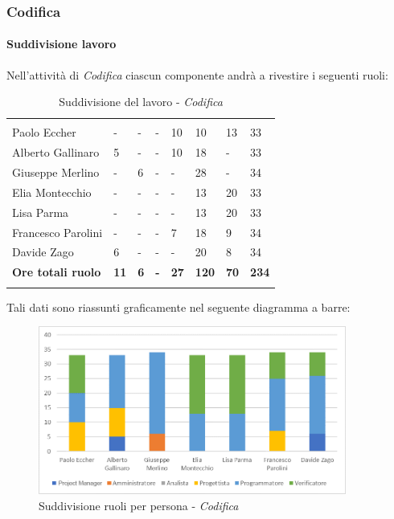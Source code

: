 		
		\subsubsection{Codifica}
			\paragraph{Suddivisione lavoro} \Spazio
			Nell'attività di \textit{Codifica} ciascun componente andrà a rivestire i seguenti ruoli:
			\begin{table}[H]
				\centering
				\begin{tabular}{|C{4cm}|C{0.8cm}|C{0.8cm}|C{0.8cm}|C{0.8cm}|C{0.8cm}|C{0.8cm}|C{3cm}|}
					 & & &&&&&\\
					Paolo Eccher      & - & - & - & 10 & 10 & 13 & 33 \\
					\hline
					Alberto Gallinaro & 5 & - & - & 10 & 18 & - & 33 \\
					\hline
					Giuseppe Merlino  & - & 6 & - & - & 28 & - & 34 \\
					\hline
					Elia Montecchio   & - & - & - & - & 13 & 20 & 33 \\
					\hline
					Lisa Parma        & - & - & - & - & 13 & 20 & 33 \\
					\hline
					Francesco Parolini& - & - & - & 7 & 18 & 9 & 34 \\
					\hline
					Davide Zago       & 6 & - & - & - & 20 & 8 & 34 \\
					\hline
					\textbf{Ore totali ruolo}  & \textbf{11} & \textbf{6} & \textbf{-} & \textbf{27} & \textbf{120} & \textbf{70} & \textbf{234} \\
				\end{tabular}
				\caption{Suddivisione del lavoro - \textit{Codifica}}
			\end{table}
			
			Tali dati sono riassunti graficamente nel seguente diagramma a barre:
			
			\begin{figure}[H] 
				\centering 
				\includegraphics[width=0.9\textwidth]{images/BarreCodifica.png} 
				\caption{Suddivisione ruoli per persona - \textit{Codifica}}
				\label{BarreCodifica}
			\end{figure}
			
